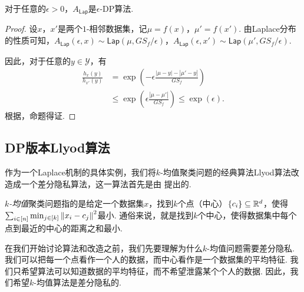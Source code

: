 \begin{theorem}\label{thm:laplace-mechanism}
    对于任意的$\epsilon > 0$，$A_{\mathsf{Lap}}$是$\epsilon$-DP算法.
\end{theorem}
\begin{proof}
设$x$，$x'$是两个$1$-相邻数据集，记$\mu = f(x)$，$\mu' = f(x')$. 由Laplace分布的性质可知，$A_{\mathsf{Lap}}(\epsilon, x) \sim \mathsf{Lap}(\mu, GS_f/\epsilon)$，$A_{\mathsf{Lap}}(\epsilon, x') \sim \mathsf{Lap}(\mu', GS_f/\epsilon)$.

因此，对于任意的$y \in \mathcal Y$，有
    \[
    \begin{aligned}
        \frac{h_{x}(y)}{h_{x'}(y)} &=\exp \left(-\epsilon \frac{|\mu - y| - |\mu' - y|}{GS_f} \right) \\
        &\leq \exp \left(\epsilon \frac{|\mu - \mu'|}{GS_f} \right)\leq \exp(\epsilon).
    \end{aligned}
    \]
根据，命题得证. 
\end{proof}

\subsection{DP版本Llyod算法}
作为一个Laplace机制的具体实例，我们将$k$-均值聚类问题的经典算法Llyod算法改造成一个差分隐私算法，这一算法首先是由 \cite{suDifferentiallyPrivateKMeans2016} 提出的.

\textit{$k$-均值}聚类问题指的是给定一个数据集$x$，找到$k$个点（中心）$\{c_i\} \subseteq \mathbb{R}^d$，使得$\sum_{i \in [n]} \min_{j\in[k]} \left\|x_i - c_j\right\|^2$最小. 通俗来说，就是找到$k$个中心，使得数据集中每个点到最近的中心的距离之和最小. 

在我们开始讨论算法和改造之前，我们先要理解为什么$k$-均值问题需要差分隐私. 我们可以把每一个点看作一个人的数据，而中心看作是一个数据集的平均特征. 我们只希望算法可以知道数据的平均特征，而不希望泄露某个个人的数据. 因此，我们希望$k$-均值算法是差分隐私的.

